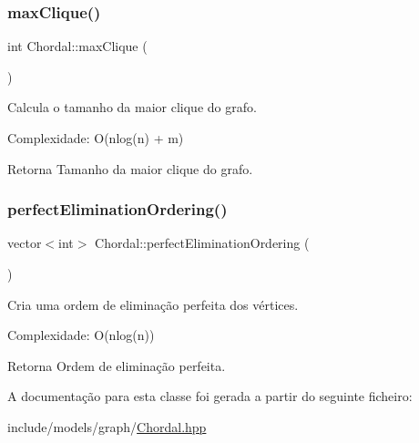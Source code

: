 \subsubsection{\texorpdfstring{maxClique()}{maxClique()}}
{\footnotesize\ttfamily int Chordal\+::max\+Clique (\begin{DoxyParamCaption}{ }\end{DoxyParamCaption})}

Calcula o tamanho da maior clique do grafo.

Complexidade\+: O(nlog(n) + m) \begin{DoxyReturn}{Retorna}
Tamanho da maior clique do grafo. 
\end{DoxyReturn}
\mbox{\label{classChordal_a45b66b1ee19a628646d83613d337d94a}} 
\subsubsection{\texorpdfstring{perfectEliminationOrdering()}{perfectEliminationOrdering()}}
{\footnotesize\ttfamily vector$<$int$>$ Chordal\+::perfect\+Elimination\+Ordering (\begin{DoxyParamCaption}{ }\end{DoxyParamCaption})}

Cria uma ordem de eliminação perfeita dos vértices.

Complexidade\+: O(nlog(n)) \begin{DoxyReturn}{Retorna}
Ordem de eliminação perfeita. 
\end{DoxyReturn}


A documentação para esta classe foi gerada a partir do seguinte ficheiro\+:\begin{DoxyCompactItemize}
\item 
include/models/graph/\mbox{\hyperlink{Chordal_8hpp}{Chordal.\+hpp}}\end{DoxyCompactItemize}
